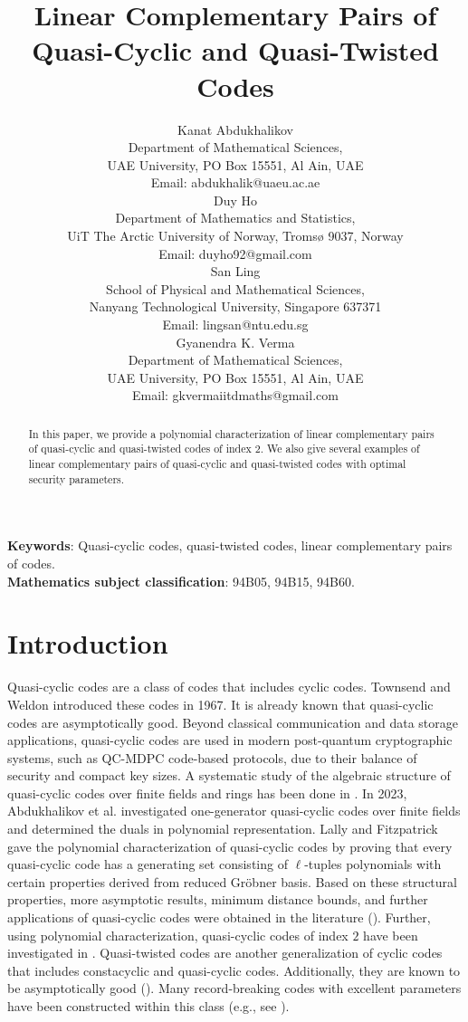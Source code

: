\documentclass[12 pt]{extarticle}
\title{Linear Complementary Pairs of Quasi-Cyclic and Quasi-Twisted Codes}
\author{Kanat Abdukhalikov \\	
Department of Mathematical Sciences, \\
UAE University, PO Box 15551, Al Ain, UAE\\
Email: abdukhalik@uaeu.ac.ae \bigskip  \\  
Duy Ho \\
Department of Mathematics and Statistics, \\
UiT The Arctic University of Norway, Tromsø
9037, Norway\\
Email: duyho92@gmail.com \bigskip \\
San Ling \\	
School of Physical and Mathematical Sciences, \\
Nanyang Technological University, Singapore 637371\\ 
 Email: lingsan@ntu.edu.sg \bigskip \\
Gyanendra K. Verma \\	
Department of Mathematical Sciences, \\
UAE University, PO Box 15551, Al Ain, UAE\\
Email:  gkvermaiitdmaths@gmail.com}
\date{}
\numberwithin{equation}{section}
\theoremstyle{definition}
\begin{document}
	\maketitle
\begin{abstract} 
 In this paper, we provide a polynomial characterization of linear complementary pairs of quasi-cyclic and quasi-twisted codes of index $2$. We also give several examples of linear complementary pairs of quasi-cyclic and quasi-twisted codes with optimal security parameters.
\end{abstract}
\textbf{Keywords}: Quasi-cyclic codes, quasi-twisted codes, linear complementary pairs of codes.\\
	\textbf{Mathematics subject classification}: 94B05, 94B15, 94B60.\\

\section{Introduction}
Quasi-cyclic codes are a class of codes that includes cyclic codes.  Townsend and  Weldon introduced these codes \cite{Townsend1967} in 1967. It is already known that quasi-cyclic codes are asymptotically good. Beyond classical communication and data storage applications, quasi-cyclic codes are used in modern post-quantum cryptographic systems, such as QC-MDPC code-based protocols, due to their balance of security and compact key sizes. A systematic study of the algebraic structure of quasi-cyclic codes over finite fields and rings has been done in \cite{Ling2006,Ling2001,Ling2003,Ling2005}.  In 2023, Abdukhalikov et al. \cite{Abdukhalikov2023} investigated one-generator quasi-cyclic codes over finite fields and determined the duals in polynomial representation. Lally and Fitzpatrick \cite{lally2001} gave the polynomial characterization of quasi-cyclic codes by proving that every
 quasi-cyclic code has a generating set consisting of $\ell$-tuples polynomials with certain properties derived from reduced Gr\"obner
 basis. Based on these structural properties, more asymptotic results, minimum distance bounds, and further applications of quasi-cyclic codes were obtained in the literature (\cite{Luo2023,Semenov2012,Zeh2015}). Further, using polynomial characterization, quasi-cyclic codes of index $2$ have been investigated in \cite{Abdukhalikov20251}. Quasi-twisted codes are another generalization of cyclic codes that includes constacyclic and quasi-cyclic codes. Additionally, they are known to be asymptotically good (\cite{chepyzhov1993,wu2020,kasami1974}). Many record-breaking codes with excellent parameters have been constructed within this class (e.g., see \cite{ackerman2011,aydin2017,qian2019}).
\end{document}
